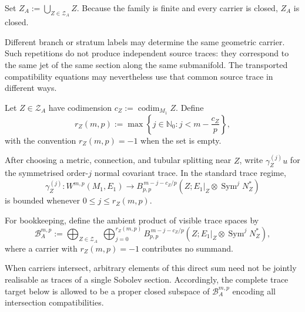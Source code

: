 \documentclass[11pt]{article}
\theoremstyle{plain}
\theoremstyle{definition}
\begin{document}
Set
\(Z_A := \bigcup_{Z\in\mathscr Z_A}Z\).
Because the family is finite and every carrier is closed,
\(Z_A\) is closed.

Different branch or stratum labels may determine the same geometric
carrier. Such repetitions do not produce independent source traces:
they correspond to the same jet of the same section along the same
submanifold. The transported compatibility equations may nevertheless
use that common source trace in different ways.

Let \(Z\in\mathscr Z_A\) have codimension
\(c_Z:=\operatorname{codim}_{M_1}Z\).
Define
\[
  r_Z(m,p)
  :=
  \max
  \left\{
    j\in\mathbb N_0:
    j<m-\frac{c_Z}{p}
  \right\},
\]
with the convention \(r_Z(m,p)=-1\) when the set is empty.

After choosing a metric, connection, and tubular splitting near \(Z\),
write \(\gamma_Z^{(j)}u\) for the symmetrised order-\(j\) normal covariant trace. In the standard
trace regime,
\[
  \gamma_Z^{(j)}:
  W^{m,p}(M_1,E_1)
  \longrightarrow
  B_{p,p}^{\,m-j-c_Z/p}
  \left(
    Z;
    E_1|_Z\otimes
    \operatorname{Sym}^jN_Z^*
  \right)
\]
is bounded whenever
\(0\leq j\leq r_Z(m,p)\).

For bookkeeping, define the ambient product of visible trace spaces by
\[
  \mathcal B_A^{m,p}
  :=
  \bigoplus_{Z\in\mathscr Z_A}
  \;
  \bigoplus_{j=0}^{r_Z(m,p)}
  B_{p,p}^{\,m-j-c_Z/p}
  \left(
    Z;
    E_1|_Z\otimes
    \operatorname{Sym}^jN_Z^*
  \right),
\]
where a carrier with \(r_Z(m,p)=-1\) contributes no summand.

When carriers intersect, arbitrary elements of this direct sum need
not be jointly realisable as traces of a single Sobolev section.
Accordingly, the complete trace target below is allowed to be a proper
closed subspace of \(\mathcal B_A^{m,p}\) encoding all intersection
compatibilities.
\end{document}
